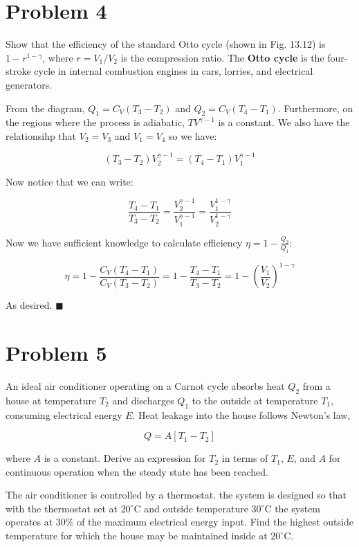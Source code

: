 \documentclass{article}
\begin{document}
\pagebreak

\section*{Problem 4}

Show that the efficiency of the standard Otto cycle (shown in Fig. 13.12) is $1-r^{1-\gamma}$, where $r = V_1/V_2$ is the compression ratio. The \textbf{Otto cycle} is the four-stroke cycle in internal combustion engines in cars, lorries, and electrical generators. 

\begin{solution}
    From the diagram, $Q_1 = C_V(T_3 - T_2)$ and $Q_2 = C_V(T_4 - T_1)$. Furthermore, on the regions where the process is adiabatic, $TV^{\gamma - 1}$ is a constant. We also have the relationsihp that $V_2 = V_3$ and $V_1 = V_4$ so we have:

    \[ (T_3 - T_2)V_2^{\gamma - 1} = (T_4 - T_1)V_1^{\gamma - 1}\]

    Now notice that we can write:

    \[ \frac{T_4 - T_1}{T_3 - T_2} = \frac{V_2^{\gamma - 1}}{V_1^{\gamma - 1}} = \frac{V_1^{1 - \gamma}}{V_2^{1 - \gamma}}\]

    Now we have sufficient knowledge to calculate efficiency $\eta = 1- \frac{Q_2}{Q_1}$:

    \[ \eta = 1 - \frac{C_V(T_4 - T_1)}{C_V(T_3 - T_2)} = 1 - \frac{T_4 - T_1}{T_3 - T_2} = 1 - \left(\frac{V_1}{V_2}\right)^{1 - \gamma}\]

    As desired. $\blacksquare$


\end{solution}


\pagebreak
\section*{Problem 5}

An ideal air conditioner operating on a Carnot cycle absorbs heat $Q_2$ from a house at temperature $T_2$ and discharges $Q_1$ to the outside at temperature $T_1$, consuming electrical energy $E$. Heat leakage into the house follows Newton's law, 

\[ Q = A[T_1 - T_2]\]

where $A$ is a constant. Derive an expression for $T_2$ in terms of $T_1$, $E$, and $A$ for continuous operation when the steady state has been reached.

The air conditioner is controlled by a thermostat. the system is designed so that with the thermostat set at $20^\circ$C and outside temperature $30^\circ$C the system operates at 30\% of the maximum electrical energy input. Find the highest outside temperature for which the house may be maintained inside at $20^\circ$C.
\end{document}
